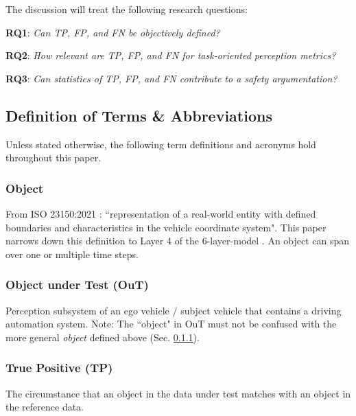 \documentclass[conference]{IEEEtran}
\begin{document}







The discussion will treat the following research questions:

\noindent \textbf{RQ1}: \textit{Can TP, FP, and FN be objectively defined?}

\noindent \textbf{RQ2}: \textit{How relevant are TP, FP, and FN for task-oriented perception metrics?}

\noindent \textbf{RQ3}: \textit{Can statistics of TP, FP, and FN contribute to a safety argumentation?}

\subsection{Definition of Terms \& Abbreviations}
Unless stated otherwise, the following term definitions and acronyms hold throughout this paper.

\subsubsection{Object} \label{def:object}
From ISO 23150:2021 \cite{ISO_23150_2021_data_communication}: 
``representation of a real-world entity with defined boundaries and characteristics in the vehicle coordinate system".
This paper narrows down this definition to Layer 4 of the 6-layer-model \cite{Scholtes20216lmAccess}. An object can span over one or multiple time steps. 

\subsubsection{Object under Test (OuT)} \label{def:out} Perception subsystem of an ego vehicle / subject vehicle that contains a driving automation system. Note: The ``object" in OuT must not be confused with the more general \textit{object} defined above (Sec. \ref{def:object}).

\subsubsection{True Positive (TP)} \label{def:tp} The circumstance that an object in the data under test matches with an object in the reference data.
\end{document}
